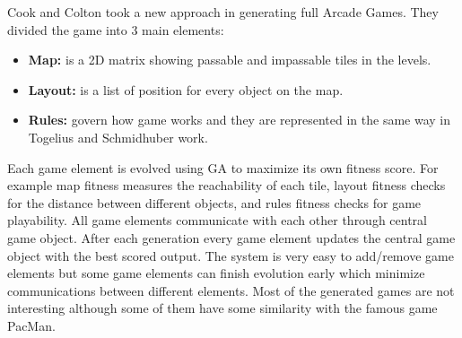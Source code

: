 Cook and Colton\cite{cookArcadeGames} took a new approach in generating full Arcade Games. They divided the game into 3 main elements:
\begin{itemize} \itemsep0pt \parskip0pt 
	\item \textbf{Map:} is a 2D matrix showing passable and impassable tiles in the levels.
	\item \textbf{Layout:} is a list of position for every object on the map.
	\item \textbf{Rules:} govern how game works and they are represented in the same way in Togelius and Schmidhuber work\cite{arcadeHillClimber}.
\end{itemize}
Each game element is evolved using GA to maximize its own fitness score. For example map fitness measures the reachability of each tile, layout fitness checks for the distance between different objects, and rules fitness checks for game playability. All game elements communicate with each other through central game object. After each generation every game element updates the central game object with the best scored output. The system is very easy to add/remove game elements but some game elements can finish evolution early which minimize communications between different elements. Most of the generated games are not interesting although some of them have some similarity with the famous game PacMan.\\\par


